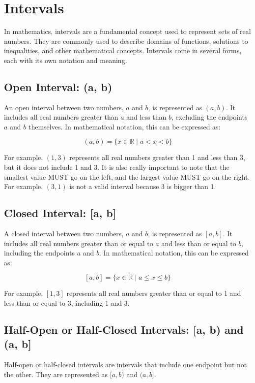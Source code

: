 \section{Intervals}

In mathematics, intervals are a fundamental concept used to represent sets of real numbers. They are commonly used to describe domains of functions, solutions to inequalities, and other mathematical concepts. Intervals come in several forms, each with its own notation and meaning.

\subsection{Open Interval: (a, b)}

An open interval between two numbers, $a$ and $b$, is represented as $(a, b)$. It includes all real numbers greater than $a$ and less than $b$, excluding the endpoints $a$ and $b$ themselves. In mathematical notation, this can be expressed as:

$$(a, b) = \{x \in \mathbb{R} \mid a < x < b\}$$

For example, $(1, 3)$ represents all real numbers greater than 1 and less than 3, but it does not include 1 and 3.
It is also really important to note that the smallest value MUST go on the left, and the largest value MUST go on the right. For example, $(3, 1)$ is not a valid interval because 3 is bigger than 1.

\subsection{Closed Interval: [a, b]}

A closed interval between two numbers, $a$ and $b$, is represented as $[a, b]$. It includes all real numbers greater than or equal to $a$ and less than or equal to $b$, including the endpoints $a$ and $b$. In mathematical notation, this can be expressed as:

$$[a, b] = \{x \in \mathbb{R} \mid a \leq x \leq b\}$$

For example, $[1, 3]$ represents all real numbers greater than or equal to 1 and less than or equal to 3, including 1 and 3.

\subsection{Half-Open or Half-Closed Intervals: [a, b) and (a, b]}

Half-open or half-closed intervals are intervals that include one endpoint but not the other. They are represented as $[a, b)$ and $(a, b]$.

